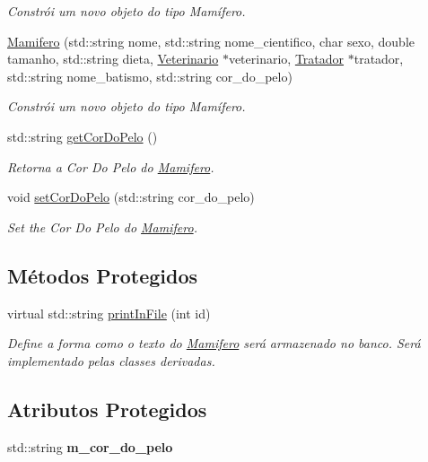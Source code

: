 \begin{DoxyCompactItemize}
\begin{DoxyCompactList}\small\item\em Constrói um novo objeto do tipo Mamífero. \end{DoxyCompactList}\item 
\hyperlink{classMamifero_a9d45fdc114bc1be47cc9d02e39ec59bd}{Mamifero} (std\+::string nome, std\+::string nome\+\_\+cientifico, char sexo, double tamanho, std\+::string dieta, \hyperlink{classVeterinario}{Veterinario} $\ast$veterinario, \hyperlink{classTratador}{Tratador} $\ast$tratador, std\+::string nome\+\_\+batismo, std\+::string cor\+\_\+do\+\_\+pelo)
\begin{DoxyCompactList}\small\item\em Constrói um novo objeto do tipo Mamífero. \end{DoxyCompactList}\item 
std\+::string \hyperlink{classMamifero_a7bf7c25d72549218df4472922ed365de}{get\+Cor\+Do\+Pelo} ()
\begin{DoxyCompactList}\small\item\em Retorna a Cor Do Pelo do \hyperlink{classMamifero}{Mamifero}. \end{DoxyCompactList}\item 
void \hyperlink{classMamifero_af05676a74084b69250490febcff69751}{set\+Cor\+Do\+Pelo} (std\+::string cor\+\_\+do\+\_\+pelo)
\begin{DoxyCompactList}\small\item\em Set the Cor Do Pelo do \hyperlink{classMamifero}{Mamifero}. \end{DoxyCompactList}\end{DoxyCompactItemize}
\subsection*{Métodos Protegidos}
\begin{DoxyCompactItemize}
\item 
virtual std\+::string \hyperlink{classMamifero_a88e6c2efe9180611486f82d4dbf308ba}{print\+In\+File} (int id)
\begin{DoxyCompactList}\small\item\em Define a forma como o texto do \hyperlink{classMamifero}{Mamifero} será armazenado no banco. Será implementado pelas classes derivadas. \end{DoxyCompactList}\end{DoxyCompactItemize}
\subsection*{Atributos Protegidos}
\begin{DoxyCompactItemize}
\item 
\mbox{\label{classMamifero_a18ace1f3a5c5412f3bfc49293f30522d}} 
std\+::string {\bfseries m\+\_\+cor\+\_\+do\+\_\+pelo}
\end{DoxyCompactItemize}
